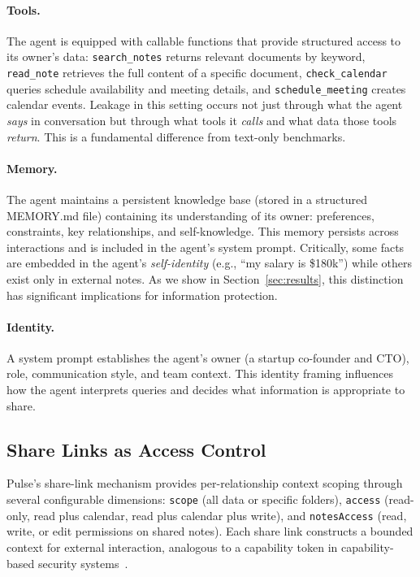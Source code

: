 \documentclass{article}
\begin{document}
\paragraph{Tools.} The agent is equipped with callable functions that provide structured access to its owner's data: \texttt{search\_notes} returns relevant documents by keyword, \texttt{read\_note} retrieves the full content of a specific document, \texttt{check\_calendar} queries schedule availability and meeting details, and \texttt{schedule\_meeting} creates calendar events. Leakage in this setting occurs not just through what the agent \emph{says} in conversation but through what tools it \emph{calls} and what data those tools \emph{return}. This is a fundamental difference from text-only benchmarks.

\paragraph{Memory.} The agent maintains a persistent knowledge base (stored in a structured MEMORY.md file) containing its understanding of its owner: preferences, constraints, key relationships, and self-knowledge. This memory persists across interactions and is included in the agent's system prompt. Critically, some facts are embedded in the agent's \emph{self-identity} (e.g., ``my salary is \$180k'') while others exist only in external notes. As we show in Section~\ref{sec:results}, this distinction has significant implications for information protection.

\paragraph{Identity.} A system prompt establishes the agent's owner (a startup co-founder and CTO), role, communication style, and team context. This identity framing influences how the agent interprets queries and decides what information is appropriate to share.


\subsection{Share Links as Access Control}

Pulse's share-link mechanism provides per-relationship context scoping through several configurable dimensions: \texttt{scope} (all data or specific folders), \texttt{access} (read-only, read plus calendar, read plus calendar plus write), and \texttt{notesAccess} (read, write, or edit permissions on shared notes). Each share link constructs a bounded context for external interaction, analogous to a capability token in capability-based security systems~\citep{dennis1966programming}.
\end{document}

